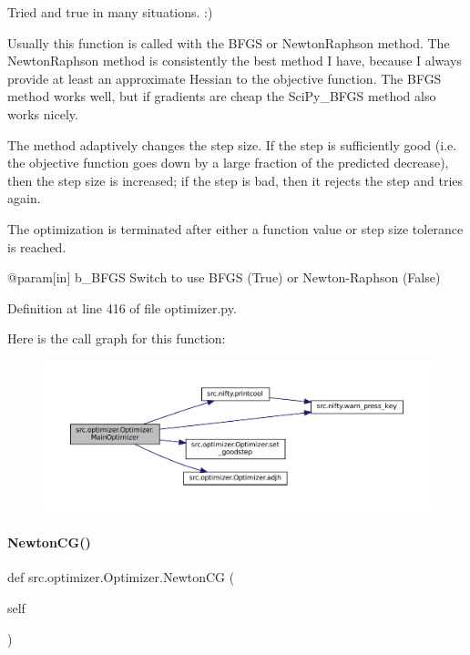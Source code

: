 Tried and true in many situations. \+:) \begin{DoxyVerb}   Usually this function is called with the BFGS or NewtonRaphson
   method.  The NewtonRaphson method is consistently the best
   method I have, because I always provide at least an
   approximate Hessian to the objective function.  The BFGS
   method works well, but if gradients are cheap the SciPy_BFGS
   method also works nicely.

   The method adaptively changes the step size.  If the step is
   sufficiently good (i.e. the objective function goes down by a
   large fraction of the predicted decrease), then the step size
   is increased; if the step is bad, then it rejects the step and
   tries again.

   The optimization is terminated after either a function value or
   step size tolerance is reached.

   @param[in] b_BFGS Switch to use BFGS (True) or Newton-Raphson (False)\end{DoxyVerb}
 

Definition at line 416 of file optimizer.\+py.

Here is the call graph for this function\+:
\nopagebreak
\begin{figure}[H]
\begin{center}
\leavevmode
\includegraphics[width=350pt]{classsrc_1_1optimizer_1_1Optimizer_a30443d919712b0f3529de3c7d62619ca_cgraph}
\end{center}
\end{figure}
\mbox{\label{classsrc_1_1optimizer_1_1Optimizer_aa1a6d36bfd020d4eb2d0fb238777d369}} 
\paragraph{\texorpdfstring{Newton\+C\+G()}{NewtonCG()}}
{\footnotesize\ttfamily def src.\+optimizer.\+Optimizer.\+Newton\+CG (\begin{DoxyParamCaption}\item[{}]{self }\end{DoxyParamCaption})}



